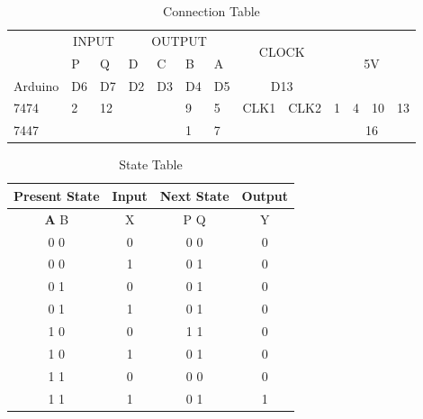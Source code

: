 \documentclass[journal,12pt,twocolumn]{IEEEtran}
\begin{document}
\newpage
\centering
\begin{table}[h]
\large
\begin{tabular}{|l|ll|llll|cl|clll|}
\hline
\multirow{2}{*}{} & \multicolumn{2}{c|}{INPUT}   & \multicolumn{4}{c|}{OUTPUT}                                                      & \multicolumn{2}{c|}{\multirow{2}{*}{CLOCK}} & \multicolumn{4}{c|}{\multirow{3}{*}{5V}}                                       \\ \cline{2-7}
                  & \multicolumn{1}{l|}{P}  & Q  & \multicolumn{1}{l|}{D}  & \multicolumn{1}{l|}{C}  & \multicolumn{1}{l|}{B}  & A  & \multicolumn{2}{c|}{}                       & \multicolumn{4}{c|}{}                                                          \\ \cline{1-9}
Arduino           & \multicolumn{1}{l|}{D6} & D7 & \multicolumn{1}{l|}{D2} & \multicolumn{1}{l|}{D3} & \multicolumn{1}{l|}{D4} & D5 & \multicolumn{2}{c|}{D13}                    & \multicolumn{4}{c|}{}                                                          \\ \hline
7474              & \multicolumn{1}{l|}{2}  & 12 & \multicolumn{1}{l|}{}   & \multicolumn{1}{l|}{}   & \multicolumn{1}{l|}{9}  & 5  & \multicolumn{1}{l|}{CLK1}       & CLK2      & \multicolumn{1}{l|}{1} & \multicolumn{1}{l|}{4} & \multicolumn{1}{l|}{10} & 13 \\ \hline
7447              & \multicolumn{1}{l|}{}   &    & \multicolumn{1}{l|}{}   & \multicolumn{1}{l|}{}   & \multicolumn{1}{l|}{1}  & 7  & \multicolumn{1}{l|}{}           &           & \multicolumn{4}{c|}{16}                                                        \\ \hline
\end{tabular}
\centering
\caption{Connection Table}
\label{table:2}
\end{table}

\begin{table}[h!]
\begin{tabular}{|c|c|c|c|}
\hline
\textbf Present State & Input & Next State & Output \\
\hline
\textbf A B & X & P Q & Y\\
\hline
0 0 & 0 & 0 0 & 0\\
0 0 & 1 & 0 1 & 0\\
0 1 & 0 & 0 1 & 0\\
0 1 & 1 & 0 1 & 0\\
1 0 & 0 & 1 1 & 0\\
1 0 & 1 & 0 1 & 0\\
1 1 & 0 & 0 0 & 0\\
1 1 & 1 & 0 1 & 1\\
\hline
\end{tabular}
\centering
\caption{State Table}
\label{table:2}
\end{table}
\end{document}
